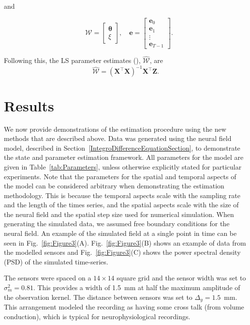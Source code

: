 \documentclass[5p,authoryear]{elsarticle}
\begin{document}
and
\begin{small}
\begin{equation*}
\quad \mathcal W=\left[
	\begin{array}{cc}
		\boldsymbol{\theta} \\
		\xi
	\end{array}
	\right],\quad \mathbf{e}=\left[
	\begin{array}{cccc}
		\mathbf e_0\\
		\mathbf e_1\\
		\vdots\\
		\mathbf e_{T-1}
	\end{array}
	\right].
\end{equation*}
\end{small}
Following this, the LS parameter estimates (\cite{Ljung1985}), $ \hat{\mathcal{W}}$, are
\begin{equation}
	\hat{\mathcal{W}}=(\mathbf X^\top\mathbf X)^{-1}\mathbf X^\top\mathbf Z. 
\end{equation}

\section{Results}\label{ResultsSection} We now provide demonstrations of the estimation procedure using the new methods that are described above. Data was generated using the neural field model, described in Section~\ref{IntegroDifferenceEquationSection}, to demonstrate the state and parameter estimation framework. All parameters for the model are given in Table~\ref{tab:Parameters}, unless otherwise explicitly stated for particular experiments. Note that the parameters for the spatial and temporal aspects of the model can be considered arbitrary when demonstrating the estimation methodology. This is because the temporal aspects scale with the sampling rate and the length of the times series, and the spatial aspects scale with the size of the neural field and the spatial step size used for numerical simulation. When generating the simulated data, we assumed free boundary conditions for the neural field. An example of the simulated field at a single point in time can be seen in Fig.~\ref{fig:Figure3}(A). Fig.~\ref{fig:Figure3}(B) shows an example of data from the modelled sensors and Fig.~\ref{fig:Figure3}(C) shows the power spectral density (PSD) of the simulated time-series. %

The sensors were spaced on a $14 \times 14$ square grid and the sensor width was set to $\sigma^2_m = 0.81$. This provides a width of 1.5~mm at half the maximum amplitude of the observation kernel. The distance between sensors was set to $\Delta_y = 1.5$~mm. This arrangement modeled the recording as having some cross talk (from volume conduction), which is typical for neurophysiological recordings.
\end{document}
